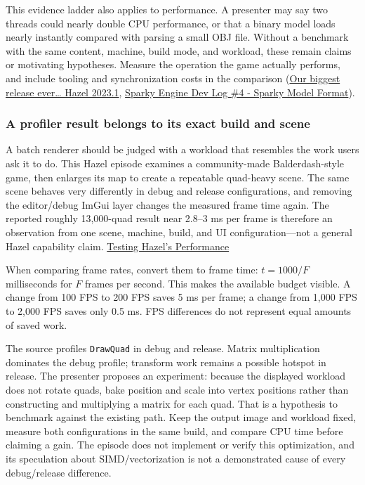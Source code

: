 This evidence ladder also applies to performance. A presenter may say two threads could nearly double CPU performance, or that a binary model loads nearly instantly compared with parsing a small OBJ file. Without a benchmark with the same content, machine, build mode, and workload, these remain claims or motivating hypotheses. Measure the operation the game actually performs, and include tooling and synchronization costs in the comparison (\href{https://www.youtube.com/watch?v=L_XLGmG2Ct8&t=1m12s}{Our biggest release ever\ldots{} Hazel 2023.1}, \href{https://www.youtube.com/watch?v=EUy8G3uMitI&t=4m30s}{Sparky Engine Dev Log \#4 - Sparky Model Format}).

\subsubsection{A profiler result belongs to its exact build and scene}\label{a-profiler-result-belongs-to-its-exact-build-and-scene}

A batch renderer should be judged with a workload that resembles the work users ask it to do. This Hazel episode examines a community-made Balderdash-style game, then enlarges its map to create a repeatable quad-heavy scene. The same scene behaves very differently in debug and release configurations, and removing the editor/debug ImGui layer changes the measured frame time again. The reported roughly 13,000-quad result near 2.8--3 ms per frame is therefore an observation from one scene, machine, build, and UI configuration---not a general Hazel capability claim. \href{https://www.youtube.com/watch?v=Yw7RpvmqvSE}{Testing Hazel's Performance}

When comparing frame rates, convert them to frame time: \(t=1000/F\) milliseconds for \(F\) frames per second. This makes the available budget visible. A change from 100 FPS to 200 FPS saves 5 ms per frame; a change from 1,000 FPS to 2,000 FPS saves only 0.5 ms. FPS differences do not represent equal amounts of saved work.

The source profiles \texttt{DrawQuad} in debug and release. Matrix multiplication dominates the debug profile; transform work remains a possible hotspot in release. The presenter proposes an experiment: because the displayed workload does not rotate quads, bake position and scale into vertex positions rather than constructing and multiplying a matrix for each quad. That is a hypothesis to benchmark against the existing path. Keep the output image and workload fixed, measure both configurations in the same build, and compare CPU time before claiming a gain. The episode does not implement or verify this optimization, and its speculation about SIMD/vectorization is not a demonstrated cause of every debug/release difference.

